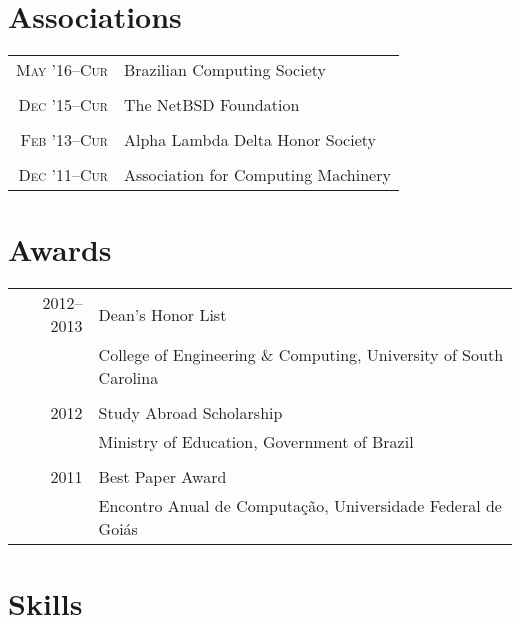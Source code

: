 \documentclass[a4paper,10pt]{article}
\begin{document}
\section{Associations}

\begin{tabular}{r|p{11cm}}

  \textsc{May '16--Cur}
  & Brazilian Computing Society\\
  \multicolumn{2}{c}{}\\

  \textsc{Dec '15--Cur}
  & The NetBSD Foundation
  \\\multicolumn{2}{c}{}\\

  \textsc{Feb '13--Cur}
  & Alpha Lambda Delta Honor Society\\
  \multicolumn{2}{c}{}\\

  \textsc{Dec '11--Cur}
  & Association for Computing Machinery\\

\end{tabular}

\section{Awards}
\begin{tabular}{r|p{11cm}}

  \textsc{2012--2013}
  & Dean's Honor List\\
  & College of Engineering \& Computing, University of South Carolina\\
  \multicolumn{2}{c}{}\\

  \textsc{2012}
  & Study Abroad Scholarship\\
  & Ministry of Education, Government of Brazil\\
  \multicolumn{2}{c}{}\\

  \textsc{2011}
  & Best Paper Award\\
  & Encontro Anual de Computação, Universidade Federal de Goiás\\

\end{tabular}

\section{Skills}
\end{document}
